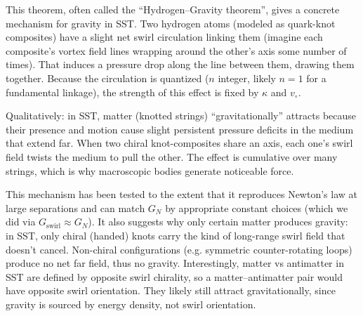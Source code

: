 \documentclass[reprint,aps,onecolumn,nofootinbib]{revtex4-2}
\begin{document}
        \noindent This theorem, often called the “Hydrogen–Gravity theorem”, gives a concrete mechanism for gravity in SST. Two hydrogen atoms (modeled as quark-knot composites) have a slight net swirl circulation linking them (imagine each composite’s vortex field lines wrapping around the other’s axis some number of times). That induces a pressure drop along the line between them, drawing them together. Because the circulation is quantized ($n$ integer, likely $n=1$ for a fundamental linkage), the strength of this effect is fixed by $\kappa$ and $v_{\circ}$.

        Qualitatively: in SST, matter (knotted strings) “gravitationally” attracts because their presence and motion cause slight persistent pressure deficits in the medium that extend far. When two chiral knot-composites share an axis, each one’s swirl field twists the medium to pull the other. The effect is cumulative over many strings, which is why macroscopic bodies generate noticeable force.

        This mechanism has been tested to the extent that it reproduces Newton’s law at large separations and can match $G_N$ by appropriate constant choices (which we did via $G_{\text{swirl}}\approx G_N$). It also suggests why only certain matter produces gravity: in SST, only chiral (handed) knots carry the kind of long-range swirl field that doesn’t cancel. Non-chiral configurations (e.g. symmetric counter-rotating loops) produce no net far field, thus no gravity. Interestingly, matter vs antimatter in SST are defined by opposite swirl chirality, so a matter–antimatter pair would have opposite swirl orientation. They likely still attract gravitationally, since gravity is sourced by energy density, not swirl orientation.

\end{document}
